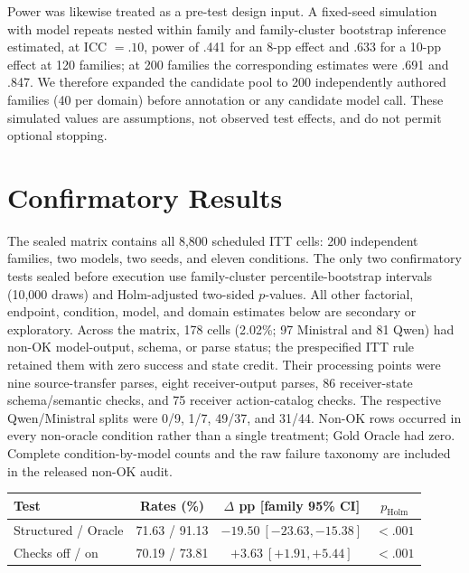 Power was likewise treated as a pre-test design input. A fixed-seed simulation
with model repeats nested within family and family-cluster bootstrap inference
estimated, at ICC $=.10$, power of .441 for an 8-pp effect and .633 for a 10-pp
effect at 120 families; at 200 families the corresponding estimates were .691
and .847. We therefore expanded the candidate pool to 200 independently
authored families (40 per domain) before annotation or any candidate model call.
These simulated values are assumptions, not observed test effects, and do not
permit optional stopping.

\section{Confirmatory Results}

The sealed matrix contains all 8,800 scheduled ITT cells: 200 independent
families, two models, two seeds, and eleven conditions. The only two
confirmatory tests sealed before execution use family-cluster percentile-bootstrap
intervals (10,000 draws) and Holm-adjusted two-sided $p$-values. All other
factorial, endpoint, condition, model, and domain estimates below are secondary
or exploratory. Across the matrix, 178 cells (2.02\%; 97 Ministral and 81
Qwen) had non-OK model-output, schema, or parse status; the prespecified ITT
rule retained them with zero success and state credit. Their processing points
were nine source-transfer parses, eight receiver-output parses, 86
receiver-state schema/semantic checks, and 75 receiver action-catalog checks.
The respective Qwen/Ministral splits were 0/9, 1/7, 49/37, and 31/44.
Non-OK rows occurred in every non-oracle condition rather than a single
treatment; Gold Oracle had zero. Complete condition-by-model counts and the raw
failure taxonomy are included in the released non-OK audit.

\begin{center}
\begin{minipage}{\columnwidth}
\centering
\scriptsize
\begin{tabular}{@{}lccc@{}}
\toprule
Test & Rates (\%) & $\Delta$ pp [family 95\% CI] & $p_{\mathrm{Holm}}$ \\
\midrule
Structured / Oracle & 71.63 / 91.13 & $-19.50\ [-23.63,-15.38]$ & $<.001$ \\
Checks off / on & 70.19 / 73.81 & $+3.63\ [+1.91,+5.44]$ & $<.001$ \\
\bottomrule
\end{tabular}
\label{tab:confirmatory-main}
\end{minipage}
\end{center}

